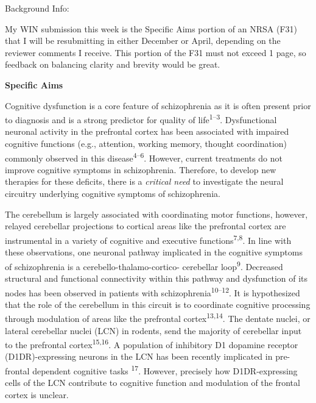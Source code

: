 \documentclass[]{article}
\date{}
\begin{document}
Background Info:

My WIN submission this week is the Specific Aims portion of an NRSA
(F31) that I will be resubmitting in either December or April, depending
on the reviewer comments I receive. This portion of the F31 must not
exceed 1 page, so feedback on balancing clarity and brevity would be
great.

\textbf{Specific Aims}

Cognitive dysfunction is a core feature of schizophrenia as it is often
present prior to diagnosis and is a strong predictor for quality of
life\textsuperscript{1--3}. Dysfunctional neuronal activity in the
prefrontal cortex has been associated with impaired cognitive functions
(e.g., attention, working memory, thought coordination) commonly
observed in this disease\textsuperscript{4--6}. However, current
treatments do not improve cognitive symptoms in schizophrenia.
Therefore, to develop new therapies for these deficits, there is a
\emph{critical need} to investigate the neural circuitry underlying
cognitive symptoms of schizophrenia.

The cerebellum is largely associated with coordinating motor functions,
however, relayed cerebellar projections to cortical areas like the
prefrontal cortex are instrumental in a variety of cognitive and
executive functions\textsuperscript{7,8}. In line with these
observations, one neuronal pathway implicated in the cognitive symptoms
of schizophrenia is a cerebello-thalamo-cortico- cerebellar
loop\textsuperscript{9}. Decreased structural and functional
connectivity within this pathway and dysfunction of its nodes has been
observed in patients with schizophrenia\textsuperscript{10--12}. It is
hypothesized that the role of the cerebellum in this circuit is to
coordinate cognitive processing through modulation of areas like the
prefrontal cortex\textsuperscript{13,14}. The dentate nuclei, or lateral
cerebellar nuclei (LCN) in rodents, send the majority of cerebellar
input to the prefrontal cortex\textsuperscript{15,16}. A population of
inhibitory D1 dopamine receptor (D1DR)-expressing neurons in the LCN has
been recently implicated in pre-frontal dependent cognitive tasks
\textsuperscript{17}. However, precisely how D1DR-expressing cells of
the LCN contribute to cognitive function and modulation of the frontal
cortex is unclear.
\end{document}
